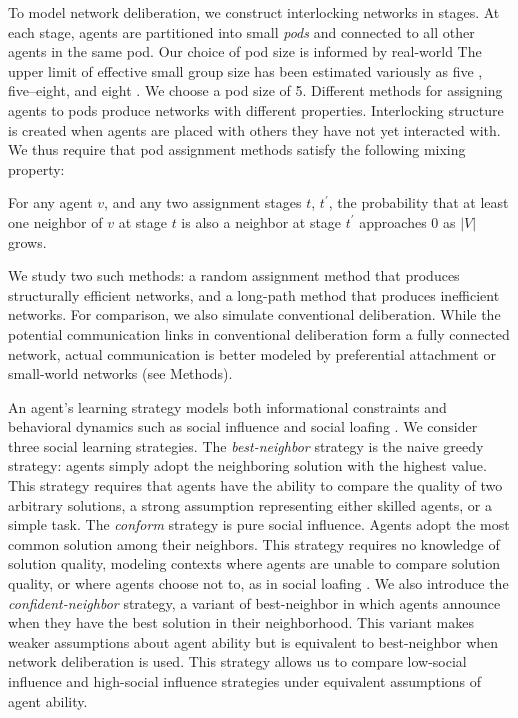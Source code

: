 To model network deliberation, we construct interlocking networks in stages. At each stage, agents are partitioned into small {\em pods} and connected to all other agents in the same pod.
Our choice of pod size is informed by real-world The upper limit of effective small group size has been estimated variously as five \cite{freeman_tyranny_1972}, five--eight\cite{lohman_designing_2000}, and eight \cite{miflin_small_2004}.
We choose a pod size of 5.
Different methods for assigning agents to pods produce networks with different properties.
Interlocking structure is created when agents are placed with others they have not yet interacted with.
We thus require that pod assignment methods satisfy the following mixing property:
\begin{property}
\label{prop:mixing}
For any agent $v$, and any two assignment stages $t$, $t^\prime$, the probability that at least one neighbor of $v$ at stage $t$ is also a neighbor at stage $t^\prime$ approaches 0 as $|V|$ grows.
\end{property}
We study two such methods: a random assignment method that produces structurally efficient networks, and a long-path method that produces inefficient networks. For comparison, we also simulate conventional deliberation. While the potential communication links in conventional deliberation form a fully connected network, actual communication is better modeled by preferential attachment \cite{barabasi_emergence_1999} or small-world \cite{watts_collective_1998} networks (see Methods).

An agent's learning strategy models both informational constraints and behavioral dynamics \cite{lazer_network_2007, barkoczi_social_2016} such as social influence and social loafing \cite{karau_social_1993}.
We consider three social learning strategies.
The {\em best-neighbor} strategy is the naive greedy strategy: agents simply adopt the neighboring solution with the highest value. This strategy requires that agents have the ability to compare the quality of two arbitrary solutions, a strong assumption representing either skilled agents, or a simple task.
The {\em conform} strategy is pure social influence. Agents adopt the most common solution among their neighbors.
This strategy requires no knowledge of solution quality, modeling contexts where agents are unable to compare solution quality, or where agents choose not to, as in social loafing \cite{karau_social_1993}.
We also introduce the {\em confident-neighbor} strategy, a variant of best-neighbor in which agents announce when they have the best solution in their neighborhood. This variant makes weaker assumptions about agent ability but is equivalent to best-neighbor when network deliberation is used.
This strategy allows us to compare low-social influence and high-social influence strategies under equivalent assumptions of agent ability.

